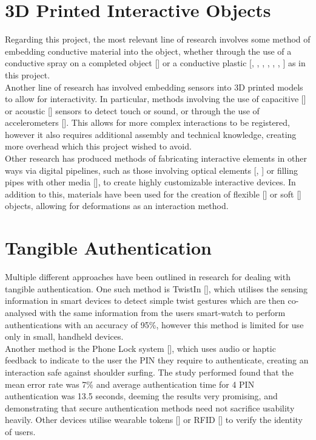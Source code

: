 \documentclass{l4proj}
\begin{document}
\section{3D Printed Interactive Objects}

Regarding this project, the most relevant line of research involves some method of embedding conductive material into the object, whether through the use of a conductive spray on a completed object [\cite{10.1145/2556288.2557046}] or a conductive plastic [\cite{10.1145/1979742.1979773}, \cite{10.1145/2207676.2208371}, \cite{schmitz2021itsy}, \cite{schmitz2018off}, \cite{marky20203d}, \cite{leigh2012simple}, \cite{kato20163d}] as in this project.\\
Another line of research has involved embedding sensors into 3D printed models to allow for interactivity. In particular, methods involving the use of capacitive [\cite{10.1145/2207676.2207743}] or acoustic [\cite{10.1145/2501988.2501989}] sensors to detect touch or sound, or through the use of accelerometers [\cite{10.1145/2559206.2581137}]. This allows for more complex interactions to be registered, however it also requires additional assembly and technical knowledge, creating more overhead which this project wished to avoid.\\
Other research has produced methods of fabricating interactive elements in other ways via digital pipelines, such as those involving optical elements [\cite{brockmeyer2013papillon}, \cite{willis2012printed}] or filling pipes with other media [\cite{savage2014series}], to create highly customizable interactive devices. In addition to this, materials have been used for the creation of flexible [\cite{schmitz2017flexibles}] or soft [\cite{peng2015layered}] objects, allowing for deformations as an interaction method.


\section{Tangible Authentication}

Multiple different approaches have been outlined in research for dealing with tangible authentication. One such method is TwistIn [\cite{leung2018twistin}], which utilises the sensing information in smart devices to detect simple twist gestures which are then co-analysed with the same information from the users smart-watch to perform authentications with an accuracy of 95\%, however this method is limited for use only in small, handheld devices. \\
Another method is the Phone Lock system [\cite{bianchi2010phone}], which uses audio or haptic feedback to indicate to the user the PIN they require to authenticate, creating an interaction safe against shoulder surfing. The study performed found that the mean error rate was 7\% and average authentication time for 4 PIN authentication was 13.5 seconds, deeming the results very promising, and demonstrating that secure authentication methods need not sacrifice usability heavily.
Other devices utilise wearable tokens [\cite{chen2008tangible}] or RFID [\cite{klompmaker2012authenticated}] to verify the identity of users.
\end{document}
